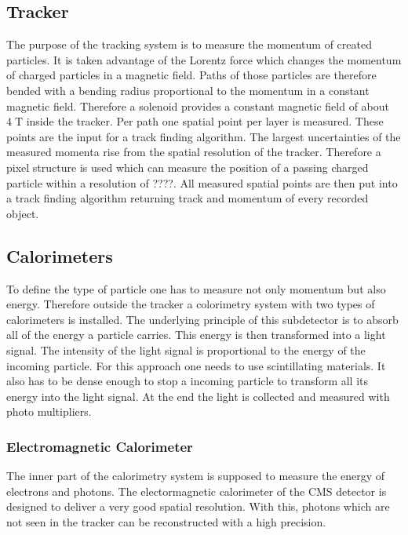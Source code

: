 \subsection{Tracker}
\label{sec:tracker}
	The purpose of the tracking system is to measure the momentum of created particles. It is taken advantage of the Lorentz force which changes the momentum of charged particles in a magnetic field. Paths of those particles are therefore bended with a bending radius proportional to the momentum in a constant magnetic field. Therefore a solenoid provides a constant magnetic field of about $4\;\text{T}$ inside the tracker. Per path one spatial point per layer is measured. These points are the input for a track finding algorithm. The largest uncertainties of the measured momenta rise from the spatial resolution of the tracker. Therefore a pixel structure is used which can measure the position of a passing charged particle within a resolution of ????.
	All measured spatial points are then put into a track finding algorithm returning track and momentum of every recorded object.

\subsection{Calorimeters}
	To define the type of particle one has to measure not only momentum but also energy. Therefore outside the tracker a colorimetry system with two types of calorimeters is installed. The underlying principle of this subdetector is to absorb all of the energy a particle carries. This energy is then transformed into a light signal. The intensity of the light signal is proportional to the energy of the incoming particle. For this approach one needs to use scintillating materials. It also has to be dense enough to stop a incoming particle to transform all its energy into the light signal. At the end the light is collected and measured with photo multipliers.
\subsubsection{Electromagnetic Calorimeter}
	The inner part of the calorimetry system is supposed to measure the energy of electrons and photons. The electormagnetic calorimeter of the CMS detector is designed to deliver a very good spatial resolution. With this, photons which are not seen in the tracker can be reconstructed with a high precision.
	
